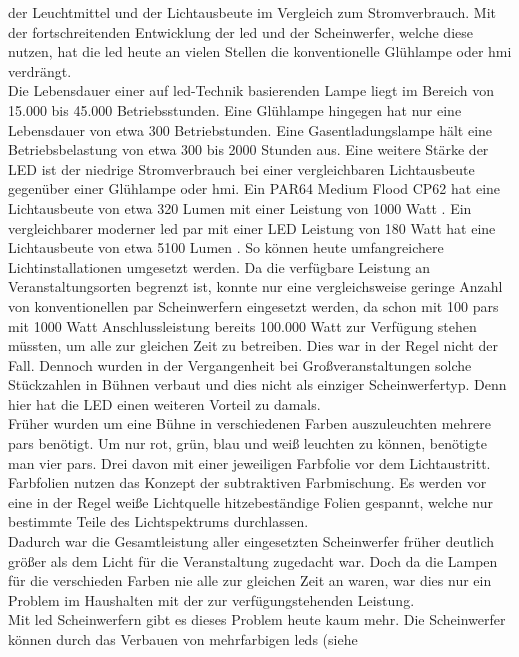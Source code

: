 \documentclass[11pt]{scrartcl}
\begin{document}
der Leuchtmittel und der Lichtausbeute im Vergleich zum Stromverbrauch. Mit der fortschreitenden Entwicklung der \ac{led} und der
Scheinwerfer, welche diese nutzen, hat die \ac{led} heute an vielen Stellen die konventionelle Glühlampe oder \ac{hmi} verdrängt.\\
Die Lebensdauer einer auf \ac{led}-Technik basierenden Lampe liegt im Bereich von 15.000 bis 45.000 Betriebsstunden. Eine Glühlampe hingegen
hat nur eine Lebensdauer von etwa 300 Betriebstunden. Eine Gasentladungslampe hält eine Betriebsbelastung von etwa 300 bis 2000 Stunden aus.
Eine weitere Stärke der LED ist der niedrige Stromverbrauch bei einer vergleichbaren Lichtausbeute gegenüber einer Glühlampe oder \ac{hmi}.
Ein PAR64 Medium Flood CP62 hat eine Lichtausbeute von etwa 320 Lumen mit einer Leistung von 1000 Watt \cite{convpar}. Ein vergleichbarer moderner
\ac{led} \ac{par} mit einer LED Leistung von 180 Watt hat eine Lichtausbeute von etwa 5100 Lumen \cite{ledpar}. So können heute umfangreichere
Lichtinstallationen umgesetzt werden. Da die verfügbare Leistung an Veranstaltungsorten begrenzt ist, konnte nur eine vergleichsweise geringe
Anzahl von konventionellen \ac{par} Scheinwerfern eingesetzt werden, da schon mit 100 \ac{par}s mit 1000 Watt Anschlussleistung bereits
100.000 Watt zur Verfügung stehen müssten, um alle zur gleichen Zeit zu betreiben. Dies war in der Regel nicht der Fall. Dennoch wurden in der
Vergangenheit bei Großveranstaltungen solche Stückzahlen in Bühnen verbaut und dies nicht als einziger Scheinwerfertyp.
Denn hier hat die LED einen weiteren Vorteil zu damals.\\
Früher wurden um eine Bühne in verschiedenen Farben auszuleuchten mehrere \ac{par}s benötigt. Um nur rot, grün, blau und weiß leuchten zu
können, benötigte man vier \ac{par}s. Drei davon mit einer jeweiligen Farbfolie vor dem Lichtaustritt. Farbfolien nutzen das Konzept der
subtraktiven Farbmischung. Es werden vor eine in der Regel weiße Lichtquelle hitzebeständige Folien gespannt, welche nur bestimmte Teile des 
Lichtspektrums durchlassen.\\
Dadurch war die Gesamtleistung aller eingesetzten Scheinwerfer früher deutlich größer als dem Licht für die Veranstaltung zugedacht war. Doch
da die Lampen für die verschieden Farben nie alle zur gleichen Zeit an waren, war dies nur ein Problem im Haushalten mit der zur verfügungstehenden
Leistung.\\
Mit \ac{led} Scheinwerfern gibt es dieses Problem heute kaum mehr. Die Scheinwerfer können durch das Verbauen von mehrfarbigen \ac{led}s (siehe
\end{document}
